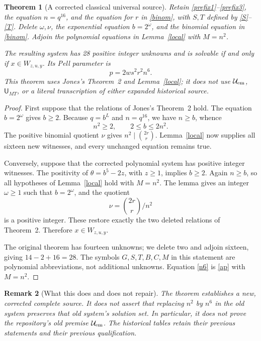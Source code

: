 \documentclass[11pt]{article}
\newtheorem{theorem}{Theorem}
\newtheorem{remark}[theorem]{Remark}
\begin{document}
\begin{theorem}[A corrected classical universal source]\label{corrected}
Retain \eqref{prefix1}--\eqref{prefix3}, the equation \(n=q^{16}\),
and the equation for \(r\) in \eqref{binom}, with \(S,T\) defined
by \eqref{S}--\eqref{T}. Delete \(\omega,\nu\), the exponential
equation \(b=2^\omega\), and the binomial equation in
\eqref{binom}. Adjoin the polynomial equations in
Lemma~\ref{local} with \(M=n^2\).

The resulting system has 28 positive integer unknowns and is solvable
if and only if \(x\in W_{z,u,y}\). Its Pell parameter is
\begin{equation}\label{n6}
                         p=2ws^2r^2n^6.
\end{equation}
This theorem uses Jones's Theorem~2 and Lemma~\ref{local}; it does
not use \(\mathcal U_{\rm em}\), \(\mathsf U_{MT}\), or a
literal transcription of either expanded historical source.
\end{theorem}
\begin{proof}
First suppose that the relations of Jones's Theorem~2 hold. The equation
\(b=2^\omega\) gives \(b\ge2\). Because \(q=b^L\) and
\(n=q^{16}\), we have \(n\ge b\), whence
\[
 n^2\ge2,\qquad 2\le b\le2n^2.
\]
The positive binomial quotient \(\nu\) gives
\(n^2\mid\binom{2r}{r}\). Lemma~\ref{local} now supplies all
sixteen new witnesses, and every unchanged equation remains true.

Conversely, suppose that the corrected polynomial system has positive
integer witnesses. The positivity of \(\theta=b^5-2z\), with
\(z\ge1\), implies \(b\ge2\). Again \(n\ge b\), so all
hypotheses of Lemma~\ref{local} hold with \(M=n^2\). The lemma
gives an integer \(\omega\ge1\) such that \(b=2^\omega\), and
the quotient
\[
                        \nu=\binom{2r}{r}/n^2
\]
is a positive integer. These restore exactly the two deleted relations
of Theorem~2. Therefore \(x\in W_{z,u,y}\).

The original theorem has fourteen unknowns; we delete two and adjoin
sixteen, giving \(14-2+16=28\). The symbols \(G,S,T,B,C,M\)
in this statement are polynomial abbreviations, not additional
unknowns. Equation \eqref{n6} is \eqref{ap} with \(M=n^2\).
\end{proof}

\begin{remark}[What this does and does not repair]
The theorem establishes a new, corrected complete source. It does not
assert that replacing \(n^2\) by \(n^6\) in the old system preserves
that old system's solution set. In particular, it does not prove the
repository's old premise \(\mathcal U_{\rm em}\). The historical
tables retain their previous statements and their previous qualification.
\end{remark}
\end{document}
